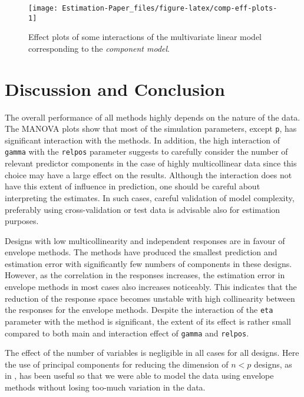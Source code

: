 \documentclass[12pt,3p,authoryear]{elsarticle}
\begin{document}
\begin{figure}[!htb]
\texttt{[image: Estimation-Paper\_files/figure-latex/comp-eff-plots-1]} \caption{Effect plots of some interactions of the
multivariate linear model corresponding to the \emph{component model}.}\label{fig:comp-eff-plots}
\end{figure}

\section{Discussion and Conclusion}\label{discussion-and-conclusion}

The overall performance of all methods highly depends on the nature of
the data. The MANOVA plots show that most of the simulation parameters,
except \texttt{p}, has significant interaction with the methods. In
addition, the high interaction of \texttt{gamma} with the
\texttt{relpos} parameter suggests to carefully consider the number of
relevant predictor components in the case of highly multicollinear data
since this choice may have a large effect on the results. Although the
interaction does not have this extent of influence in prediction, one
should be careful about interpreting the estimates. In such cases,
careful validation of model complexity, preferably using
cross-validation or test data is advisable also for estimation purposes.

Designs with low multicollinearity and independent responses are in
favour of envelope methods. The methods have produced the smallest
prediction and estimation error with significantly few numbers of
components in these designs. However, as the correlation in the
responses increases, the estimation error in envelope methods in most
cases also increases noticeably. This indicates that the reduction of
the response space becomes unstable with high collinearity between the
responses for the envelope methods. Despite the interaction of the
\texttt{eta} parameter with the method is significant, the extent of its
effect is rather small compared to both main and interaction effect of
\texttt{gamma} and \texttt{relpos}.

The effect of the number of variables is negligible in all cases for all
designs. Here the use of principal components for reducing the dimension
of \(n<p\) designs, as in \citet{rimal2019pred}, has been useful so that
we were able to model the data using envelope methods without losing
too-much variation in the data.
\end{document}
